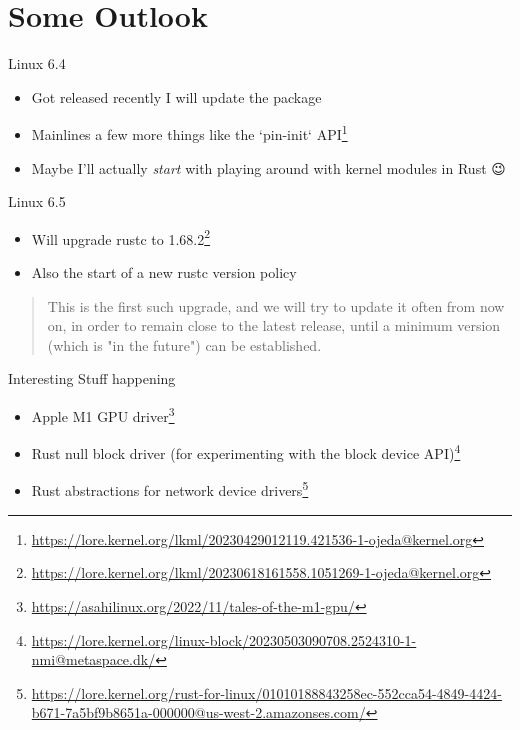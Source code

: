 \section{Some Outlook}

\begin{frame}[c]{Linux 6.4}
  \begin{itemize}
    \item Got released recently \rightarrow{} I will update the package
    \item Mainlines a few more things like the `pin-init` API\footnote{\url{https://lore.kernel.org/lkml/20230429012119.421536-1-ojeda@kernel.org}}
    \item Maybe I'll actually \emph{start} with playing around with kernel modules in Rust {\Emoji😉}
  \end{itemize}
\end{frame}

\begin{frame}[c]{Linux 6.5}
  \begin{itemize}
    \item Will upgrade rustc to 1.68.2\footnote{\url{https://lore.kernel.org/lkml/20230618161558.1051269-1-ojeda@kernel.org}}
    \item Also the start of a new rustc version policy
  \end{itemize}

  \begin{quote}
    This is the first such upgrade, and we will try to update it often from
    now on, in order to remain close to the latest release, until a minimum
    version (which is "in the future") can be established.
  \end{quote}
\end{frame}

\begin{frame}[c]{Interesting Stuff happening}
  \begin{itemize}
    \item Apple M1 GPU driver\footnote{\url{https://asahilinux.org/2022/11/tales-of-the-m1-gpu/}}
    \item Rust null block driver (for experimenting with the block device API)\footnote{\url{https://lore.kernel.org/linux-block/20230503090708.2524310-1-nmi@metaspace.dk/}}
    \item Rust abstractions for network device drivers\footnote{\url{https://lore.kernel.org/rust-for-linux/01010188843258ec-552cca54-4849-4424-b671-7a5bf9b8651a-000000@us-west-2.amazonses.com/}}
  \end{itemize}
\end{frame}

